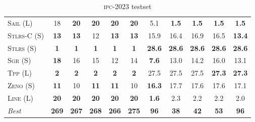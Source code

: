 \begin{table}[tb]
{\begin{tabular}{|l||ccccc||ccccc||}
\textsc{Sail} (L)&18&\textbf{20}&\textbf{20}&\textbf{20}&\textbf{20}&5.1&\textbf{1.5}&\textbf{1.5}&\textbf{1.5}&\textbf{1.5}\\
\textsc{Stlrs-C} (S)&\textbf{13}&\textbf{13}&12&\textbf{13}&\textbf{13}&15.9&16.4&16.9&16.5&\textbf{13.4}\\
\textsc{Stlrs} (S)&\textbf{1}&\textbf{1}&\textbf{1}&\textbf{1}&\textbf{1}&\textbf{28.6}&\textbf{28.6}&\textbf{28.6}&\textbf{28.6}&\textbf{28.6}\\
\textsc{Sgr} (S)&\textbf{18}&16&15&12&14&\textbf{7.6}&13.0&14.2&16.0&13.1\\
\textsc{Tpp} (L)&\textbf{2}&\textbf{2}&\textbf{2}&\textbf{2}&\textbf{2}&27.5&27.5&27.5&\textbf{27.3}&\textbf{27.3}\\
\textsc{Zeno} (S)&\textbf{11}&10&\textbf{11}&\textbf{11}&10&\textbf{16.3}&17.7&17.6&17.6&17.1\\
\textsc{Line} (L)&\textbf{20}&\textbf{20}&\textbf{20}&\textbf{20}&\textbf{20}&\textbf{1.6}&2.3&2.2&2.2&2.0
\\\hline
\textit{Best}&\textbf{269}&\textbf{267}&\textbf{268}&\textbf{266}&\textbf{275}&\textbf{96}&\textbf{38}&\textbf{42}&\textbf{53}&\textbf{96}\\\hline

        \end{tabular}}
        \caption{\textsc{ipc}-2023 testset}
        \label{tab:ipc}
        \end{table}
        